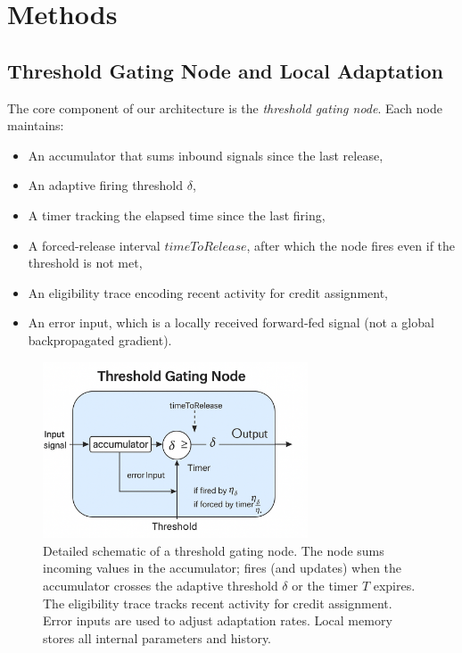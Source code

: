 \documentclass[11pt]{article}
\begin{document}
\section{Methods}

\subsection{Threshold Gating Node and Local Adaptation}
The core component of our architecture is the \emph{threshold gating node}. Each node maintains:
\begin{itemize}
    \item An accumulator that sums inbound signals since the last release,
    \item An adaptive firing threshold \(\delta\),
    \item A timer tracking the elapsed time since the last firing,
    \item A forced-release interval \(timeToRelease\), after which the node fires even if the threshold is not met,
    \item An eligibility trace encoding recent activity for credit assignment,
    \item An error input, which is a locally received forward-fed signal (not a global backpropagated gradient).
\end{itemize}
\begin{figure}[ht]
    \centering
    \includegraphics[width=0.7\textwidth]{architecture_diagrams/1fe38644-c569-4658-b345-f5d0ddced01b.png}
    \caption{
        Detailed schematic of a threshold gating node. The node sums incoming values in the accumulator; fires (and updates) when the accumulator crosses the adaptive threshold \(\delta\) or the timer \(T\) expires. The eligibility trace tracks recent activity for credit assignment. Error inputs are used to adjust adaptation rates. Local memory stores all internal parameters and history.
    }
    \label{fig:threshold-gating-node}
\end{figure}
\end{document}
